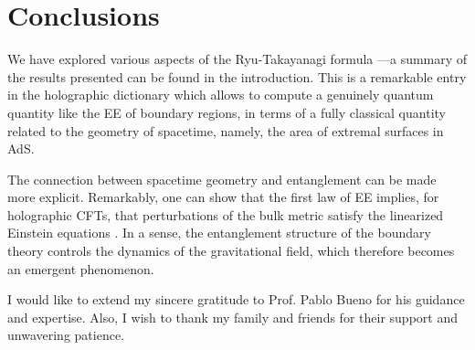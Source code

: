 \documentclass[twocolumn]{revtex4}
\begin{document}
\section{Conclusions} \label{s:Conclusions}
We have explored various aspects of the Ryu-Takayanagi formula ---a summary of the results presented can be found in the introduction. This is a remarkable entry in the holographic dictionary which allows to compute a genuinely quantum quantity like the EE of boundary regions, in terms of a fully classical quantity related to the geometry of spacetime, namely, the area of extremal surfaces in AdS.

The connection between spacetime geometry and entanglement can be made more explicit. Remarkably, one can show that the first law of EE implies, for holographic CFTs, that perturbations of the bulk metric satisfy the linearized Einstein equations \cite{faulkner_gravitation_2014}. In a sense, the entanglement structure of the boundary theory controls the dynamics of the gravitational field, which therefore becomes an emergent phenomenon.



\begin{acknowledgments}

    I would like to extend my sincere gratitude to Prof. Pablo Bueno for his guidance and expertise. Also, I wish to thank my family and friends for their support and unwavering patience.
    
\end{acknowledgments}




% 
\end{document}

